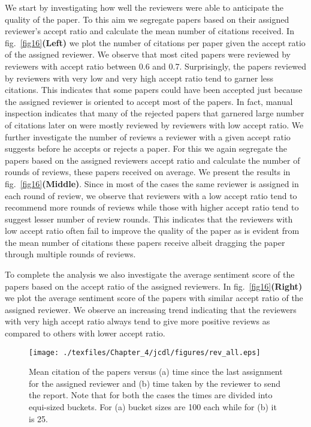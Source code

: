 We start by investigating how well the reviewers were able to anticipate the quality of the paper. To this aim we segregate papers based on their assigned reviewer's accept ratio and calculate the mean number of citations received. In fig.~\ref{fig16}{\bf (Left)} we plot the number of citations per paper given the accept ratio of the assigned reviewer. We observe that most cited papers were reviewed by reviewers with accept ratio between 0.6 and 0.7. Surprisingly, the papers reviewed by reviewers with very low and very high accept ratio tend to garner less citations. This indicates that some papers could have been accepted just because the assigned reviewer is oriented to accept most of the papers. In fact, manual inspection indicates that many of the rejected papers that garnered large number of citations later on were mostly reviewed by reviewers with low accept ratio. We further investigate the number of reviews a reviewer with a given accept ratio suggests before he accepts or rejects a paper. For this we again segregate the papers based on the assigned reviewers accept ratio and calculate the number of rounds of reviews, these papers received on average. We present the results in fig.~\ref{fig16}{\bf (Middle)}. Since in most of the cases the same reviewer is assigned in each round of review, we observe that reviewers with a low accept ratio tend to recommend more rounds of reviews while those with higher accept ratio tend to suggest lesser number of review rounds. This indicates that the reviewers with low accept ratio often fail to improve the quality of the paper as is evident from the mean number of citations these papers receive albeit dragging the paper through multiple rounds of reviews.


To complete the analysis we also investigate the average sentiment score of the papers based on the accept ratio of the assigned reviewers. In fig.~\ref{fig16}{\bf (Right)} we plot the average sentiment score of the papers with similar accept ratio of the assigned reviewer. We observe an increasing trend indicating that the reviewers with very high accept ratio always tend to give more positive reviews as compared to others with lower accept ratio. \iffalse Note that we also repeat the analysis for the small set of editors separately; in all cases the results show exactly similar trends as in case of reviewers.\fi 


\begin{figure}
\centering
\texttt{[image: ./texfiles/Chapter\_4/jcdl/figures/rev\_all.eps]}
\caption{\label{fig:rev} Mean citation of the papers versus (a) time since the last assignment for the assigned reviewer and (b) time taken by the reviewer to send the report. Note that for both the cases the times are divided into equi-sized buckets. For (a) bucket sizes are 100 each while for (b) it is 25.}
\end{figure}

